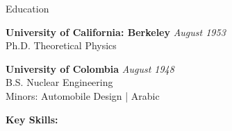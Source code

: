 \documentclass{./resume}
\begin{document}
\begin{rSection}{Education}

{\bf University of California: Berkeley} \hfill {\em August 1953}
\vspace{2pt}
  \\ Ph.D. Theoretical Physics
  
{\bf University of Colombia} \hfill {\em August 1948}
\vspace{2pt}
  \\ B.S. Nuclear Engineering
  \\ Minors: Automobile Design | Arabic

%
%
%
%
%
%
%   
%
%
%
%

%
%
{\bf Key Skills:}
\vspace{-1.83em}


\end{rSection}
\end{document}
